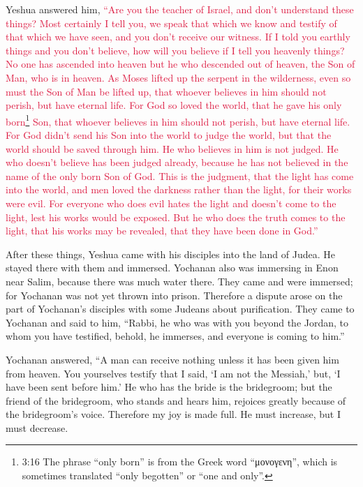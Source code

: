 \myverse{}Yeshua answered him,
\textcolor{crimson}{“Are you the teacher of Israel, and don’t understand these things?
}
\myverse{}\textcolor{crimson}{Most certainly I tell you, we speak that which we know and testify of
	that which we have seen, and you don’t receive our witness.
}
\myverse{}\textcolor{crimson}{If I told you earthly things and you don’t believe, how will you believe
	if I tell you heavenly things?
}
\myverse{}\textcolor{crimson}{No one has ascended into heaven but he who descended out of heaven, the
	Son of Man, who is in heaven.
}
\myverse{}\textcolor{crimson}{As Moses lifted up the serpent in the wilderness, even so must the Son
	of Man be lifted up,
}
\myverse{}\textcolor{crimson}{that whoever believes in him should not perish, but have eternal life.
}
\myverse{}\textcolor{crimson}{For God so loved the world, that he gave his only born}\footnote{3:16 The phrase “only born” is from the Greek word “μονογενη”, which is sometimes translated “only
	begotten” or “one and only”.}
\textcolor{crimson}{Son, that whoever believes in him should not perish, but have eternal life.
}
\myverse{}\textcolor{crimson}{For God didn’t send his Son into the world to judge the world, but that
	the world should be saved through him.
}
\myverse{}\textcolor{crimson}{He who believes in him is not judged. He who doesn’t believe has been
	judged already, because he has not believed in the name of the only born Son of God.
}
\myverse{}\textcolor{crimson}{This is the judgment, that the light has come into the world, and men
	loved the darkness rather than the light, for their works were evil.
}
\myverse{}\textcolor{crimson}{For everyone who does evil hates the light and doesn’t come to the light,
	lest his works would be exposed.
}
\myverse{}\textcolor{crimson}{But he who does the truth comes to the light, that his works may be revealed,
	that they have been done in God.”}

\myverse{}After these things, Yeshua came with his disciples into the land
of Judea. He stayed there with them and immersed.
\myverse{}Yochanan also was immersing in Enon near Salim, because there was much water
there. They came and were immersed;
\myverse{}for Yochanan was not yet thrown into prison.
\myverse{}Therefore a dispute arose on the part of Yochanan’s disciples with some Judeans about purification.
\myverse{}They came to Yochanan and said to him, “Rabbi, he who was with you beyond
the Jordan, to whom you have testified, behold, he immerses, and everyone is coming to him.”

\myverse{}Yochanan answered, “A man can receive nothing unless it has been
given him from heaven.
\myverse{}You yourselves testify that I said, ‘I am not the Messiah,’ but, ‘I have been
sent before him.’
\myverse{}He who has the bride is the bridegroom; but the friend of the bridegroom,
who stands and hears him, rejoices greatly because of the bridegroom’s voice. Therefore my joy is made
full.
\myverse{}He must increase, but I must decrease.

